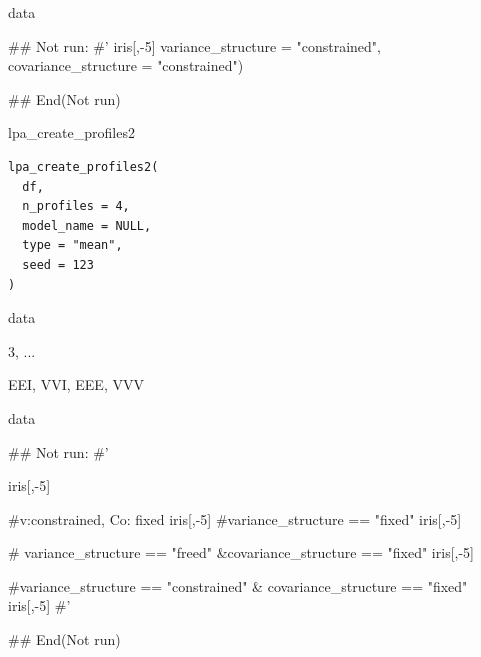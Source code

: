 \documentclass[a4paper]{book}
\begin{document}
%
\begin{Value}
data
\end{Value}
%
\begin{Examples}
\begin{ExampleCode}

\#\# Not run: 
#'
iris[,-5]%
                                    variance_structure = "constrained",
                                    covariance_structure = "constrained")

## End(Not run)


\end{ExampleCode}
\end{Examples}
%
\begin{Description}
lpa\_create\_profiles2
\end{Description}
%
\begin{Usage}
\begin{verbatim}
lpa_create_profiles2(
  df,
  n_profiles = 4,
  model_name = NULL,
  type = "mean",
  seed = 123
)
\end{verbatim}
\end{Usage}
%
\begin{Arguments}
\begin{ldescription}
\item[\code{df}] data

\item[\code{n\_profiles}] 3, ...

\item[\code{model\_name}] EEI, VVI, EEE, VVV
\end{ldescription}
\end{Arguments}
%
\begin{Value}
data
\end{Value}
%
\begin{Examples}
\begin{ExampleCode}

\#\# Not run: 
#'

iris[,-5] %

#v:constrained, Co: fixed
iris[,-5] %
#variance_structure == "fixed"
iris[,-5] %


# variance_structure == "freed" &covariance_structure == "fixed"
iris[,-5] %


#variance_structure == "constrained" & covariance_structure == "fixed"
iris[,-5] %
#'

## End(Not run)

\end{ExampleCode}
\end{Examples}
\end{document}
